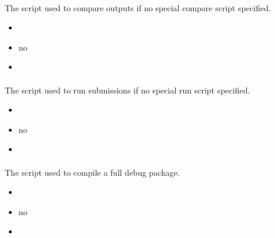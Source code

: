 \documentclass[a4paper,10pt,english,openany]{sphinxmanual}
\begin{document}
\paragraph{}
\label{\detokenize{configuration-reference:default-compare}}
\sphinxAtStartPar
The script used to compare outputs if no special compare script specified.
\begin{itemize}
\item {} 
\sphinxAtStartPar
{} 

\item {} 
\sphinxAtStartPar
{} no

\item {} 
\sphinxAtStartPar
{} 

\end{itemize}


\paragraph{}
\label{\detokenize{configuration-reference:default-run}}
\sphinxAtStartPar
The script used to run submissions if no special run script specified.
\begin{itemize}
\item {} 
\sphinxAtStartPar
{} 

\item {} 
\sphinxAtStartPar
{} no

\item {} 
\sphinxAtStartPar
{} 

\end{itemize}


\paragraph{}
\label{\detokenize{configuration-reference:default-full-debug}}
\sphinxAtStartPar
The script used to compile a full debug package.
\begin{itemize}
\item {} 
\sphinxAtStartPar
{} 

\item {} 
\sphinxAtStartPar
{} no

\item {} 
\sphinxAtStartPar
{} 

\end{itemize}
\end{document}
